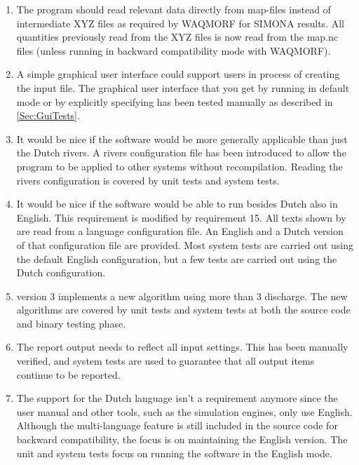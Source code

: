 \begin{enumerate}
\item The program should read relevant data directly from \dflowfm map-files instead of intermediate XYZ files as required by WAQMORF for SIMONA results.
All quantities previously read from the XYZ files is now read from the \dflowfm map.nc files (unless running in backward compatibility mode with WAQMORF).

\item A simple graphical user interface could support users in process of creating the input file.
The graphical user interface that you get by running \dfastmi in default mode or by explicitly specifying  has been tested manually as described in \autoref{Sec:GuiTests}.

\item It would be nice if the software would be more generally applicable than just the Dutch rivers.
A rivers configuration file has been introduced to allow the program to be applied to other systems without recompilation.
Reading the rivers configuration is covered by unit tests and system tests.

\item It would be nice if the software would be able to run besides Dutch also in English.
This requirement is modified by requirement 15.
All texts shown by \dfastmi are read from a language configuration file.
An English and a Dutch version of that configuration file are provided.
Most system tests are carried out using the default English configuration, but a few tests are carried out using the Dutch configuration.

\item \dfastmi version 3 implements a new algorithm using more than 3 discharge.
The new algorithms are covered by unit tests and system tests at both the source code and binary testing phase.

\item The report output needs to reflect all input settings.
This has been manually verified, and system tests are used to guarantee that all output items continue to be reported.

\item The support for the Dutch language isn’t a requirement anymore since the user manual and other tools, such as the simulation engines, only use English.
Although the multi-language feature is still included in the source code for backward compatibility, the focus is on maintaining the English version.
The unit and system tests focus on running the software in the English mode.
\end{enumerate}

